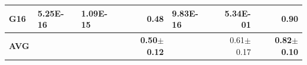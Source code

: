 \documentclass[encoding=utf8,british]{tumphthesis}
\begin{document}
\begin{table}[H]
\begin{subtable}{1.0\textwidth}
{\begin{tabular}{|l|llr|lr|r|}
\textbf{G16}                              & 5.25E-16                                             & 1.09E-15                                              & \textbf{0.48}                                    & 9.83E-16                                                       & 5.34E-01                                         & \textbf{0.90}                                            \\ \hline
\rowcolor[HTML]{CFE2F3} 
\textbf{AVG}                             &                                                      &                                                       & \textbf{0.50$\pm$0.12}                           &                                                                & 0.61$\pm$0.17                                    & \textbf{0.82$\pm$0.10}                                  
 \\ \hline
\end{tabular}}
    \end{subtable}

    \bigskip
    \hfill


\end{table}
\end{document}
